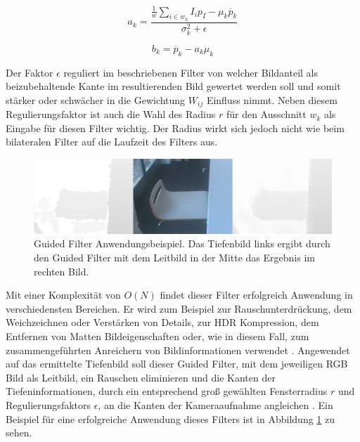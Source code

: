 \begin{equation} \label{eq:gf-a}
a_k = \frac{\frac{1}{w} \sum_{i \in w_k} I_i p_I - \mu_k \overline{p}_k}{\sigma_k^2+\epsilon}
\end{equation}

\begin{equation} \label{eq:gf-b}
b_k = \overline{p}_k - a_k\mu_k
\end{equation}


Der Faktor \(\epsilon\) reguliert im beschriebenen Filter von \citet{he2010guided} welcher Bildanteil als beizubehaltende Kante im resultierenden Bild gewertet werden soll und somit stärker oder schwächer in die Gewichtung \(W_{ij}\) Einfluss nimmt. Neben diesem Regulierungsfaktor ist auch die Wahl des Radius \(r\) für den Ausschnitt \(w_k\) als Eingabe für diesen Filter wichtig. Der Radius wirkt sich jedoch nicht wie beim bilateralen Filter auf die Laufzeit des Filters aus. \citep{he2010guided} 

\begin{figure}[h]
  \centering
	\includegraphics[width=1.0\textwidth]{content/images/methods/gf-result.png} 
  \caption{Guided Filter Anwendungsbeispiel. Das Tiefenbild links ergibt durch den Guided Filter mit dem Leitbild in der Mitte das Ergebnis im rechten Bild.}
  \label{fig:gf-result}
\end{figure}

Mit einer Komplexität von \(O(N)\) findet dieser Filter erfolgreich Anwendung  in verschiedensten Bereichen. Er wird zum Beispiel zur Rauschunterdrückung, dem Weichzeichnen oder Verstärken von Details, zur HDR Kompression, dem Entfernen von Matten Bildeigenschaften oder, wie in diesem Fall, zum zusammengeführten Anreichern von Bildinformationen verwendet \citep{he2010guided}. Angewendet auf das ermittelte Tiefenbild soll dieser Guided Filter, mit dem jeweiligen RGB Bild als Leitbild, ein Rauschen eliminieren und die Kanten der Tiefeninformationen, durch ein entsprechend groß gewählten Fensterradius \(r\) und Regulierungsfaktors \(\epsilon\), an die Kanten der Kameraaufnahme angleichen \citep{liu2012guided}. Ein Beispiel für eine erfolgreiche Anwendung dieses Filters ist in Abbildung \ref{fig:gf-result} zu sehen.


